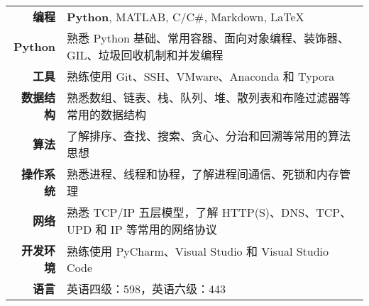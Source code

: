 %

\begin{table}[!htbp]
    \begin{tabular}{rl}
        \icon{\faCode} \textbf{编程} & \textbf{Python}, MATLAB, C/C\#, Markdown, \LaTeX \\
        \textbf{Python} & 熟悉 Python 基础、常用容器、面向对象编程、装饰器、GIL、垃圾回收机制和并发编程 \\
        \icon{\faTools} \textbf{工具} & 熟练使用 Git、SSH、VMware、Anaconda 和 Typora \\
        \textbf{数据结构} & 熟悉数组、链表、栈、队列、堆、散列表和布隆过滤器等常用的数据结构 \\
        \icon{\faPaperPlane} \textbf{算法} & 了解排序、查找、搜索、贪心、分治和回溯等常用的算法思想 \\
        \textbf{操作系统} & 熟悉进程、线程和协程，了解进程间通信、死锁和内存管理 \\
        \icon{\faNetworkWired} \textbf{网络} & 熟悉 TCP/IP 五层模型，了解 HTTP(S)、DNS、TCP、UPD 和 IP 等常用的网络协议\\
        \textbf{开发环境} & 熟练使用 PyCharm、Visual Studio 和 Visual Studio Code \\
        
        \icon{\faLanguage} \textbf{语言} & 英语四级：598，英语六级：443 
    \end{tabular}
\end{table} 